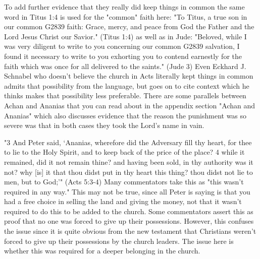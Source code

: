 \documentclass[11pt]{article}
\begin{document}
To add further evidence that they really did keep things in common the same word in Titus 1:4 is used for the "common" faith here: "To Titus, a true son in our common G2839 faith: Grace, mercy, and peace from God the Father and the Lord Jesus Christ our Savior." (Titus 1:4) as well as in Jude: "Beloved, while I was very diligent to write to you concerning our common G2839 salvation, I found it necessary to write to you exhorting you to contend earnestly for the faith which was once for all delivered to the saints." (Jude 3)
Even Eckhard J. Schnabel who doesn't believe the church in Acts literally kept things in common admits that possibility from the language, but goes on to cite context which he thinks makes that possibility less preferable.\cite{Essenes common property} There are some parallels between Achan and Ananias that you can read about in the appendix section "Achan and Ananias" which also discusses evidence that the reason the punishment was so severe was that in both cases they took the Lord's name in vain. 

"3 And Peter said, `Ananias, wherefore did the Adversary fill thy heart, for thee to lie to the Holy Spirit, and to keep back of the price of the place?
4 while it remained, did it not remain thine? and having been sold, in thy authority was it not? why [is] it that thou didst put in thy heart this thing? thou didst not lie to men, but to God;'" (Acts 5:3-4)
Many commentators take this as "this wasn't required in any way." This may not be true, since all Peter is saying is that you had a free choice in selling the land and giving the money, not that it wasn't required to do this to be added to the church. Some commentators assert this as proof that no one was forced to give up their possessions. However, this confuses the issue since it is quite obvious from the new testament that Christians weren't forced to give up their possessions by the church leaders. The issue here is whether this was required for a deeper belonging in the church.
\end{document}
